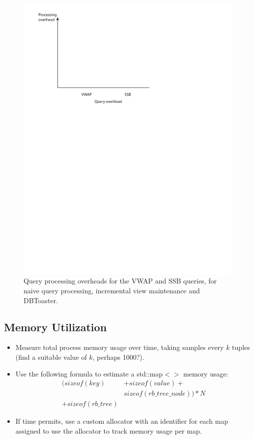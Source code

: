 \documentclass{sig-alternate}
\begin{document}
\begin{figure}
\includegraphics[scale=0.6]{figures/axes-query.pdf}
\caption{Query processing overheads for the VWAP and SSB queries, for naive
  query processing, incremental view maintenance and DBToaster.}
\label{fig:overhead-vwap-ssb}
\end{figure}

\subsection{Memory Utilization}
\begin{itemize}
\item Measure total process memory usage over time, taking samples every $k$
  tuples (find a suitable value of $k$, perhaps 1000?).
\item Use the following formula to estimate a std::map$<>$ memory usage:
\begin{align*}
(sizeof(key) & + sizeof(value) + \\
& sizeof(rb\_tree\_node))*N\\
+ sizeof(rb\_tree)
\end{align*}

\item If time permits, use a custom allocator with an identifier for each map
assigned to use the allocator to track memory usage per map.
\end{itemize}
\end{document}
